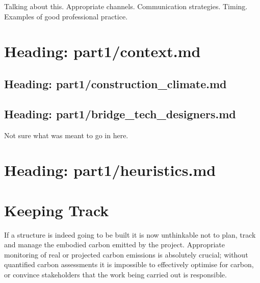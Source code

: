 \documentclass[letterpaper,10pt,english]{jupyterBook}
\begin{document}
\sphinxAtStartPar
Talking about this. Appropriate channels. Communication strategies. Timing. Examples of good professional practice.

\sphinxstepscope


\chapter{Heading: part1/context.md}
\label{\detokenize{part1/context:heading-part1-context-md}}\label{\detokenize{part1/context::doc}}
\sphinxstepscope


\section{Heading: part1/construction\_climate.md}
\label{\detokenize{part1/construction_climate:heading-part1-construction-climate-md}}\label{\detokenize{part1/construction_climate::doc}}
\sphinxstepscope


\section{Heading: part1/bridge\_tech\_designers.md}
\label{\detokenize{part1/bridge_tech_designers:heading-part1-bridge-tech-designers-md}}\label{\detokenize{part1/bridge_tech_designers::doc}}
\sphinxAtStartPar
Not sure what was meant to go in here.

\sphinxstepscope


\chapter{Heading: part1/heuristics.md}
\label{\detokenize{part1/heuristics:heading-part1-heuristics-md}}\label{\detokenize{part1/heuristics::doc}}
\sphinxstepscope


\chapter{Keeping Track}
\label{\detokenize{part1/keeping_track:keeping-track}}\label{\detokenize{part1/keeping_track::doc}}
\sphinxAtStartPar
If a structure is indeed going to be built it is now unthinkable not to plan, track and manage the embodied carbon emitted by the project. Appropriate monitoring of real or projected carbon emissions is absolutely crucial; without quantified carbon assessments it is impossible to effectively optimise for carbon, or convince stakeholders that the work being carried out is responsible.
\end{document}
